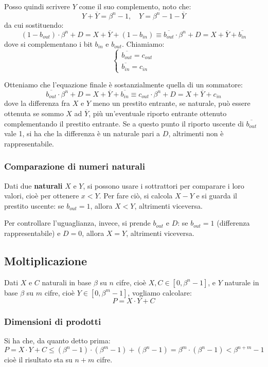 \documentclass[a4paper,11pt]{article}
\begin{document}
Posso quindi scrivere $Y$ come il suo complemento, noto che:
$$ 
Y + \overline{Y} = \beta^n - 1, \quad Y = \beta^n - 1 - \overline{Y}
$$
da cui sostituendo:
$$
(1 - b_{out}) \cdot \beta^n + D = X + \overline{Y} + (1-b_{in}) \equiv \overline{b_{out}} \cdot \beta^n + D = X + \overline{Y} + \overline{b_{in}}
$$
dove si complementano i bit $b_{in}$ e $b_{out}$.
Chiamiamo:
\[
	\begin{cases}
		\overline{b_{out}} = c_{out} \\ 
		\overline{b_{in}} = c_{in}
	\end{cases}
\]

Otteniamo che l'equazione finale è sostanzialmente quella di un sommatore:
$$ 
\overline{b_{out}} \cdot \beta^n + D = X + \overline{Y} + \overline{b_{in}} \equiv c_{out} \cdot \beta^n + D = X + \overline{Y} + c_{in}
$$
dove la differenza fra $X$ e $Y$ meno un prestito entrante, se naturale, può essere ottenuta se sommo $X$ ad $\overline{Y}$, più un'eventuale riporto entrante ottenuto complementando il prestito entrante.
Se a questo punto il riporto uscente di $\overline{b_{out}}$ vale 1, si ha che la differenza è un naturale pari a $D$, altrimenti non è rappresentabile.

\subsubsection{Comparazione di numeri naturali}
Dati due \textbf{naturali} $X$ e $Y$, si possono usare i sottrattori per comparare i loro valori, cioè per ottenere $x < Y$.
Per fare ciò, si calcola $X - Y$ e si guarda il prestito uscente: se $b_{out} = 1$, allora $X<Y$, altrimenti viceversa.

Per controllare l'uguaglianza, invece, si prende $b_{out}$ e $D$: se $b_{out} = 1$ (differenza rappresentabile) e $D=0$, allora $X = Y$, altrimenti viceversa.

\subsection{Moltiplicazione}
Dati $X$ e $C$ naturali in base $\beta$ su $n$ cifre, cioè $X,C \in [0, \beta^n - 1]$, e $Y$ naturale in base $\beta$ su $m$ cifre, cioè $Y \in [0, \beta^m - 1]$, vogliamo calcolare:
$$
P = X \cdot Y + C 
$$

\subsubsection{Dimensioni di prodotti}
Si ha che, da quanto detto prima:
$$
P = X \cdot Y + C \leq (\beta^n - 1) \cdot (\beta^m - 1) + (\beta^n - 1) = \beta^m \cdot (\beta^n - 1) < \beta^{n+m} - 1 
$$
cioè il risultato sta su $n+m$ cifre.
\end{document}
